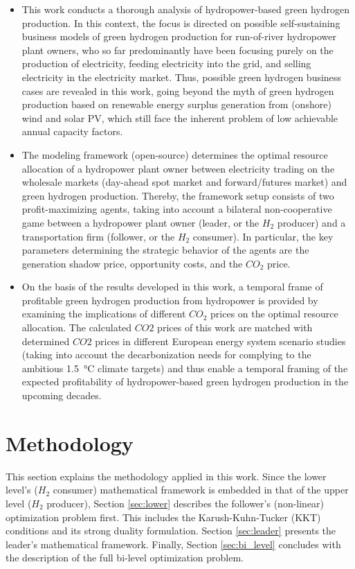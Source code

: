 \documentclass[review]{elsarticle}
\begin{document}
\begin{itemize}
	\item This work conducts a thorough analysis of hydropower-based green hydrogen production. In this context, the focus is directed on possible self-sustaining business models of green hydrogen production for run-of-river hydropower plant owners, who so far predominantly have been focusing purely on the production of electricity, feeding electricity into the grid, and selling electricity in the electricity market. Thus, possible green hydrogen business cases are revealed in this work, going beyond the myth of green hydrogen production based on renewable energy surplus generation from (onshore) wind and solar PV, which still face the inherent problem of low achievable annual capacity factors. 
	
	\item The modeling framework (open-source) determines the optimal resource allocation of a hydropower plant owner between electricity trading on the wholesale markets (day-ahead spot market and forward/futures market) and green hydrogen production. Thereby, the framework setup consists of two profit-maximizing agents, taking into account a bilateral non-cooperative game between a hydropower plant owner (leader, or the $H_2$ producer) and a transportation firm (follower, or the $H_2$ consumer). In particular, the key parameters determining the strategic behavior of the agents are the generation shadow price, opportunity costs, and the $CO_2$ price.  
	
	\item On the basis of the results developed in this work, a temporal frame of profitable green hydrogen production from hydropower is provided by examining the implications of different $CO_2$ prices on the optimal resource allocation. The calculated $CO2$ prices of this work are matched with determined $CO2$ prices in different European energy system scenario studies (taking into account the decarbonization needs for complying to the ambitious \SI{1.5}{\degreeCelsius} climate targets) and thus enable a temporal framing of the expected profitability of hydropower-based green hydrogen production in the upcoming decades. 
\end{itemize}
\newpage
\section{Methodology}\label{methodology}
This section explains the methodology applied in this work. Since the lower level's ($H_2$ consumer) mathematical framework is embedded in that of the upper level ($H_2$ producer), Section \ref{sec:lower} describes the follower's (non-linear) optimization problem first. This includes the Karush-Kuhn-Tucker (KKT) conditions and its strong duality formulation. Section \ref{sec:leader} presents the leader's mathematical framework. Finally, Section \ref{sec:bi_level} concludes with the description of the full bi-level optimization problem.
\end{document}

